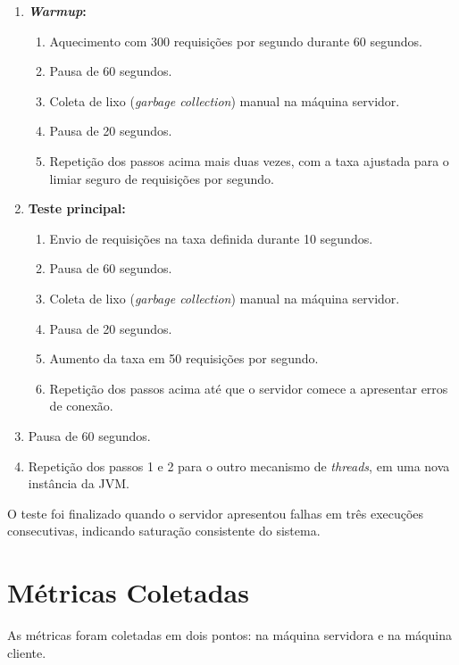 \documentclass[12pt, openright, oneside, a4paper, english,	french,	spanish, brazil	]{abntex2}
\begin{document}
    \begin{enumerate}
        \item \textbf{\textit{Warmup}:}
        \begin{enumerate}
            \item Aquecimento com 300 requisições por segundo durante 60 segundos.
            \item Pausa de 60 segundos.
            \item Coleta de lixo (\textit{garbage collection}) manual na máquina servidor.
            \item Pausa de 20 segundos.
            \item Repetição dos passos acima mais duas vezes, com a taxa ajustada para o limiar seguro de requisições por segundo.
        \end{enumerate}

        \item \textbf{Teste principal:}
        \begin{enumerate}
            \item Envio de requisições na taxa definida durante 10 segundos.
            \item Pausa de 60 segundos.
            \item Coleta de lixo (\textit{garbage collection}) manual na máquina servidor.
            \item Pausa de 20 segundos.
            \item Aumento da taxa em 50 requisições por segundo.
            \item Repetição dos passos acima até que o servidor comece a apresentar erros de conexão.
        \end{enumerate}
        \item Pausa de 60 segundos.
        \item Repetição dos passos 1 e 2 para o outro mecanismo de \textit{threads}, em uma nova instância da JVM.
    \end{enumerate}

    O teste foi finalizado quando o servidor apresentou falhas em três execuções consecutivas, indicando saturação consistente do sistema.  

    \section{Métricas Coletadas}

    As métricas foram coletadas em dois pontos: na máquina servidora e na máquina cliente.
\end{document}
